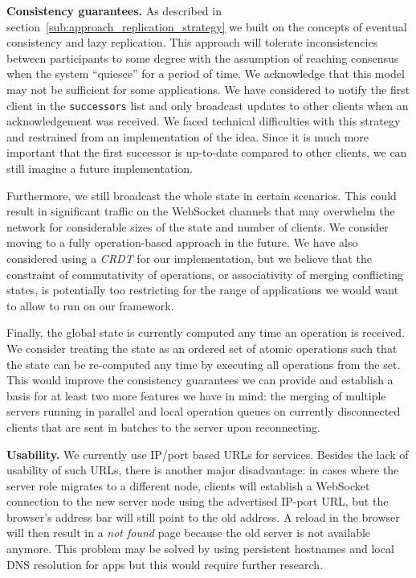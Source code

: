 \textbf{Consistency guarantees.}
As described in section~\ref{sub:approach_replication_strategy} we built \APIName on the concepts of eventual consistency and lazy replication. 
This approach will tolerate inconsistencies between participants to some degree with the assumption of reaching consensus when the system ``quiesce'' for a period of time. 
We acknowledge that this model may not be sufficient for some applications. 
We have considered to notify the first client in the \texttt{successors} list and only broadcast updates to other clients when an acknowledgement was received.
We faced technical difficulties with this strategy and restrained from an implementation of the idea.
Since it is much more important that the first successor is up-to-date compared to other clients, we can still imagine a future implementation.

Furthermore, we still broadcast the whole state in certain scenarios.
This could result in significant traffic on the WebSocket channels that may overwhelm the network for considerable sizes of the state and number of clients. 
We consider moving to a fully operation-based approach in the future.
We have also considered using a \textit{CRDT} for our implementation, but we believe that the constraint of commutativity of operations, or associativity of merging conflicting states, is potentially too restricting for the range of applications we would want to allow to run on our framework.

Finally, the global state is currently computed any time an operation is received. We consider treating the state as an ordered set of atomic operations such that the state can be re-computed any time by executing all operations from the set. This would improve the consistency guarantees we can provide and establish a basis for at least two more features we have in mind: the merging of multiple servers running in parallel and local operation queues on currently disconnected clients that are sent in batches to the server upon reconnecting.

\textbf{Usability.}
We currently use IP/port based URLs for \APIshort services. Besides the lack of usability of such URLs, there is another major disadvantage: in cases where the server role migrates to a different node, clients will establish a WebSocket connection to the new server node using the advertised IP-port URL, but the browser's address bar will still point to the old address. A reload in the browser will then result in a \textit{not found} page because the old server is not available anymore. This problem may be solved by using persistent hostnames and local DNS resolution for \APIshort apps but this would require further research.

